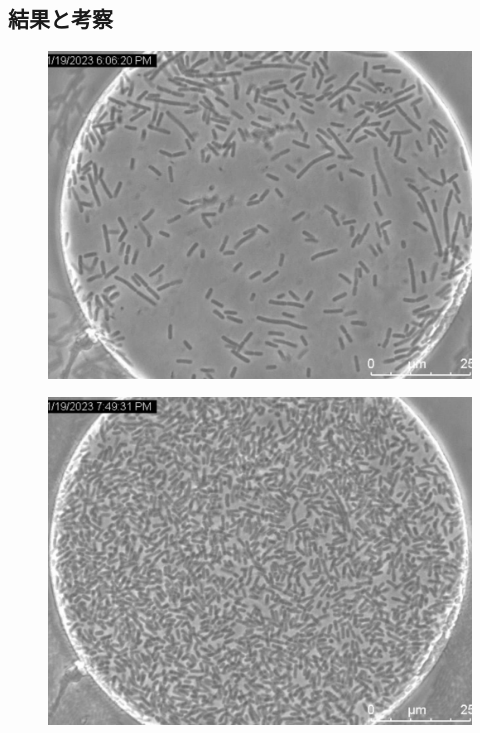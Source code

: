 \documentclass[a4paper,11pt,titlepage]{jsarticle}
\begin{document}
\subsection{結果と考察}

\begin{figure}[htbp]
  \centering
  \begin{minipage}{0.45\linewidth}
    \centering
    \includegraphics[width=\columnwidth]{Series006_t00000.pdf}
    \label{fig:64_1_m9}
  \end{minipage}
  \begin{minipage}{0.45\linewidth}
    \centering
    \includegraphics[width=\columnwidth]{Series010_t000000.pdf}

\end{minipage}
\end{figure}
\end{document}
